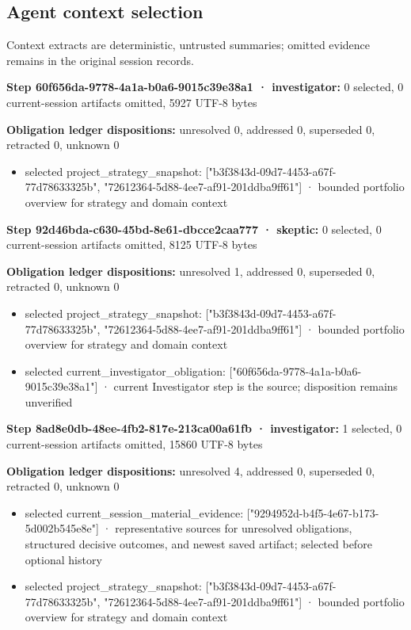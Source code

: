 \documentclass[11pt]{article}
\begin{document}
\subsection{Agent context selection}
Context extracts are deterministic, untrusted summaries; omitted evidence remains in the original session records.\par
\textbf{Step 60f656da-9778-4a1a-b0a6-9015c39e38a1 · investigator:} 0 selected, 0 current-session artifacts omitted, 5927 UTF-8 bytes\par
\textbf{Obligation ledger dispositions:} unresolved 0, addressed 0, superseded 0, retracted 0, unknown 0\par
\begin{itemize}
\item selected project\_strategy\_snapshot: ["b3f3843d-09d7-4453-a67f-77d78633325b", "72612364-5d88-4ee7-af91-201ddba9ff61"] · bounded portfolio overview for strategy and domain context
\end{itemize}
\textbf{Step 92d46bda-c630-45bd-8e61-dbcce2caa777 · skeptic:} 0 selected, 0 current-session artifacts omitted, 8125 UTF-8 bytes\par
\textbf{Obligation ledger dispositions:} unresolved 1, addressed 0, superseded 0, retracted 0, unknown 0\par
\begin{itemize}
\item selected project\_strategy\_snapshot: ["b3f3843d-09d7-4453-a67f-77d78633325b", "72612364-5d88-4ee7-af91-201ddba9ff61"] · bounded portfolio overview for strategy and domain context
\item selected current\_investigator\_obligation: ["60f656da-9778-4a1a-b0a6-9015c39e38a1"] · current Investigator step is the source; disposition remains unverified
\end{itemize}
\textbf{Step 8ad8e0db-48ee-4fb2-817e-213ca00a61fb · investigator:} 1 selected, 0 current-session artifacts omitted, 15860 UTF-8 bytes\par
\textbf{Obligation ledger dispositions:} unresolved 4, addressed 0, superseded 0, retracted 0, unknown 0\par
\begin{itemize}
\item selected current\_session\_material\_evidence: ["9294952d-b4f5-4e67-b173-5d002b545e8e"] · representative sources for unresolved obligations, structured decisive outcomes, and newest saved artifact; selected before optional history
\item selected project\_strategy\_snapshot: ["b3f3843d-09d7-4453-a67f-77d78633325b", "72612364-5d88-4ee7-af91-201ddba9ff61"] · bounded portfolio overview for strategy and domain context
\end{itemize}
\end{document}
